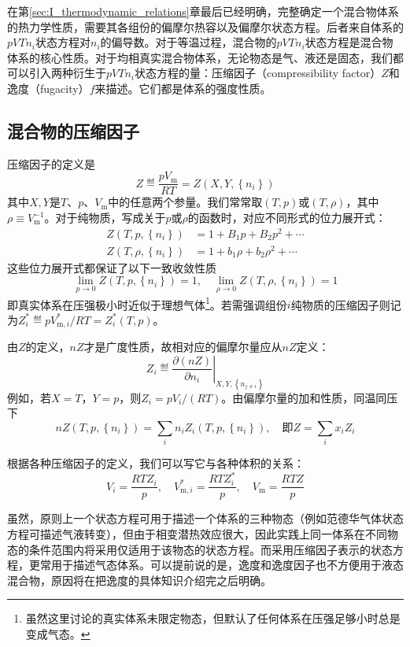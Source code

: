 \documentclass[main.tex]{subfiles}
\begin{document}
在第\ref{sec:I_thermodynamic_relations}章最后已经明确，完整确定一个混合物体系的热力学性质，需要其各组份的偏摩尔热容以及偏摩尔状态方程。后者来自体系的$pVTn_i$状态方程对$n_i$的偏导数。对于等温过程，混合物的$pVTn_i$状态方程是混合物体系的核心性质。对于均相真实混合物体系，无论物态是气、液还是固态，我们都可以引入两种衍生于$pVTn_i$状态方程的量：压缩因子（compressibility factor）$Z$和逸度（fugacity）$f$来描述。它们都是体系的强度性质。

\subsection{混合物的压缩因子}
压缩因子的定义是
\[Z\eqdef \frac{pV_\text{m}}{RT}=Z\left(X,Y,\left\{n_i\right\}\right)\]
其中$X,Y$是$T$、$p$、$V_\text{m}$中的任意两个参量。我们常常取$\left(T,p\right)$或$\left(T,\rho\right)$，其中$\rho\equiv V^{-1}_\text{m}$。对于纯物质，写成关于$p$或$\rho$的函数时，对应不同形式的位力展开式：
\begin{align*}
    Z\left(T,p,\left\{n_i\right\}\right)    & =1+B_1p+B_2p^2+\cdots       \\
    Z\left(T,\rho,\left\{n_i\right\}\right) & =1+b_1\rho+b_2\rho^2+\cdots
\end{align*}
这些位力展开式都保证了以下一致收敛性质
\[\lim_{p\to 0}Z\left(T,p,\left\{n_i\right\}\right)=1,\quad\lim_{\rho\to 0}Z\left(T,\rho,\left\{n_i\right\}\right)=1\]
即真实体系在压强极小时近似于理想气体\footnote{虽然这里讨论的真实体系未限定物态，但默认了任何体系在压强足够小时总是变成气态。}。若需强调组份$i$纯物质的压缩因子则记为$Z_i^*\eqdef pV_{\text{m},i}^*/RT=Z_i^*\left(T,p\right)$。

由$Z$的定义，$nZ$才是广度性质，故相对应的偏摩尔量应从$nZ$定义：
\[Z_i\eqdef\left.\frac{\partial\left(nZ\right)}{\partial n_i}\right|_{X,Y,\left\{n_{j\neq i}\right\}}\]
例如，若$X=T$，$Y=p$，则$Z_i=pV_i/\left(RT\right)$。由偏摩尔量的加和性质，同温同压下
\[nZ\left(T,p,\left\{n_i\right\}\right)=\sum_in_iZ_i\left(T,p,\left\{n_i\right\}\right),\quad \text{即}Z=\sum_ix_iZ_i\]

根据各种压缩因子的定义，我们可以写它与各种体积的关系：
\[V_i=\frac{RTZ_i}{p},\quad V_{\text{m},i}^*=\frac{RTZ_i^*}{p},\quad V_\text{m}=\frac{RTZ}{p}\]

虽然，原则上一个状态方程可用于描述一个体系的三种物态（例如范德华气体状态方程可描述气液转变），但由于相变潜热效应很大，因此实践上同一体系在不同物态的条件范围内将采用仅适用于该物态的状态方程。而采用压缩因子表示的状态方程，更常用于描述气态体系。可以提前说的是，逸度和逸度因子也不方便用于液态混合物，原因将在把逸度的具体知识介绍完之后明确。
\end{document}

